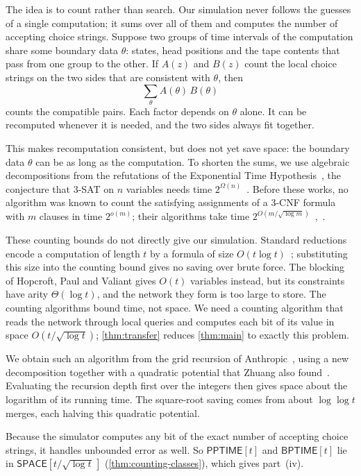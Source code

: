 \documentclass[11pt]{article}
\theoremstyle{definition}
\theoremstyle{definition}
\theoremstyle{remark}
\newcommand{\SPACE}{\mathsf{SPACE}}
\newcommand{\BPTIME}{\mathsf{BPTIME}}
\newcommand{\PPTIME}{\mathsf{PPTIME}}
\begin{document}
The idea is to count rather than search. Our simulation never follows the guesses of a single computation; it sums over all of them and computes the number of accepting choice strings. Suppose two groups of time intervals of the computation share some boundary data $\theta$: states, head positions and the tape contents that pass from one group to the other. If $A(z)$ and $B(z)$ count the local choice strings on the two sides that are consistent with $\theta$, then
\[
\sum_\theta A(\theta)\,B(\theta)
\]
counts the compatible pairs. Each factor depends on $\theta$ alone. It can be recomputed whenever it is needed, and the two sides always fit together.

This makes recomputation consistent, but does not yet save space: the boundary data $\theta$ can be as long as the computation. To shorten the sums, we use algebraic decompositions from the refutations of the Exponential Time Hypothesis~\cite{Ope26,Ant26}, the conjecture that $3$-SAT on $n$ variables needs time $2^{\Omega(n)}$~\cite{IP01}. Before these works, no algorithm was known to count the satisfying assignments of a $3$-CNF formula with $m$ clauses in time $2^{o(m)}$; their algorithms take time $2^{O(m/\sqrt{\log m})}$~\cite[App.~D.2]{Ope26},~\cite[Main Theorem]{Ant26}.

These counting bounds do not directly give our simulation. Standard reductions encode a computation of length $t$ by a formula of size $O(t\log t)$~\cite{PF79,Coo88}; substituting this size into the counting bound gives no saving over brute force. The blocking of Hopcroft, Paul and Valiant gives $O(t)$ variables instead, but its constraints have arity $\Theta(\log t)$, and the network they form is too large to store. The counting algorithms bound time, not space. We need a counting algorithm that reads the network through local queries and computes each bit of its value in space $O(t/\sqrt{\log t})$; \cref{thm:transfer} reduces \cref{thm:main} to exactly this problem.

We obtain such an algorithm from the grid recursion of Anthropic~\cite{Ant26}, using a new decomposition together with a quadratic potential that Zhuang also found~\cite{Zhu26}. Evaluating the recursion depth first over the integers then gives space about the logarithm of its running time. The square-root saving comes from about $\log\log t$ merges, each halving this quadratic potential.

Because the simulator computes any bit of the exact number of accepting choice strings, it handles unbounded error as well. So $\PPTIME[t]$ and $\BPTIME[t]$ lie in $\SPACE[t/\sqrt{\log t}\,]$ (\cref{thm:counting-classes}), which gives part~(iv).
\end{document}

